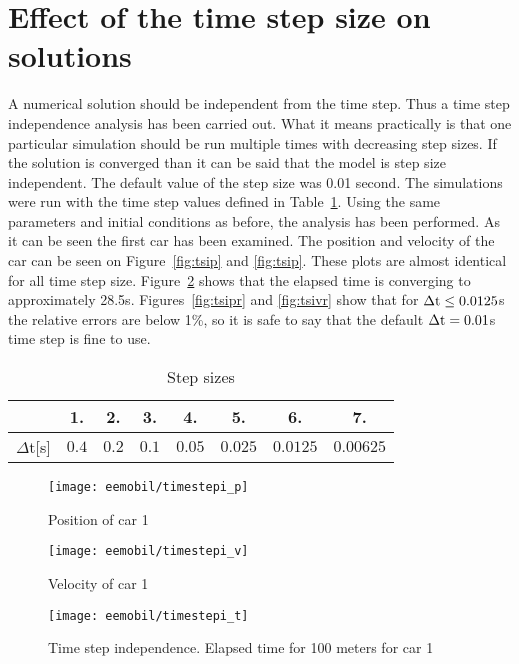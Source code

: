		\section{Effect of the time step size on solutions}
		A numerical solution should be independent from the time step. Thus a time step independence analysis has been carried out. What it means practically is that one particular simulation should be run multiple times with decreasing step sizes. If the solution is converged than it can be said that the model is step size independent. The default value of the step size was 0.01 second. The simulations were run with the time step values defined in Table~\ref{tab:timestepsizes}.
		Using the same parameters and initial conditions as before, the analysis has been performed. As it can be seen the first car has been examined. The position and velocity of the car can be seen on Figure~\ref{fig:tsip} and \ref{fig:tsip}. These plots are almost identical for all time step size. Figure~\ref{fig:tsit} shows that the elapsed time is converging to approximately 28.5s. Figures~\ref{fig:tsipr} and \ref{fig:tsivr} show that for $\Delta \rm{t}\leq 0.0125$s the relative errors are below 1\%, so it is safe to say that the default $\Delta \rm{t}=0.01$s time step is fine to use.
		\begin{table}
			\begin{center}
				\begin{tabular}{ |c||c|c|c|c|c|c|c|}
					\hline
					&1. & 2. & 3. & 4. & 5. & 6. & 7.\\
					\hline
					$\Delta$t[s]& $0.4$ & $0.2$ & $0.1$ & $0.05$ & $0.025$ & $0.0125$ & $0.00625$\\
					\hline
				\end{tabular}
			\end{center}
			\caption{Step sizes}
			\label{tab:timestepsizes}
		\end{table}
		\begin{figure}
			\centering
			\begin{minipage}{.5\textwidth}
				\centering
				\texttt{[image: eemobil/timestepi\_p]}
				\caption{Position of car 1}
				\label{fig:tsip}
			\end{minipage}\hfill
			\begin{minipage}{.5\textwidth}
				\centering
				\texttt{[image: eemobil/timestepi\_v]}
				\caption{Velocity of car 1}
				\label{fig:tsiv}
			\end{minipage}
		\end{figure}
		\begin{figure}
			\centering
			\texttt{[image: eemobil/timestepi\_t]}
			\caption{Time step independence. Elapsed time for 100 meters for car 1}
			\label{fig:tsit}
		\end{figure}
